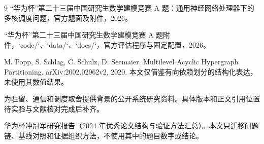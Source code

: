 \clearpage
\begin{thebibliography}{9}
“华为杯”第二十三届中国研究生数学建模竞赛 A 题：通用神经网络处理器下的多核调度问题，官方题面及附件，2026。

“华为杯”第二十三届中国研究生数学建模竞赛 A 题附件，`code/`、`data/`、`docs/`，官方评估程序与固定配置，2026。

M. Popp, S. Schlag, C. Schulz, D. Seemaier. Multilevel Acyclic Hypergraph Partitioning. arXiv:2002.02962v2, 2020. 本文仅借鉴有向依赖划分的结构化表达，未使用其数值结果。

为驻留、通信和调度取舍提供背景的公开系统研究资料。具体版本和正文引用位置待实验与文献核对完成后补齐。

华为杯冲冠军研究报告（2024 年优秀论文结构与验证方法汇总）。本文只迁移问题链、基线对照和证据组织方法，不使用其中的题目数字或结论。
\end{thebibliography}
